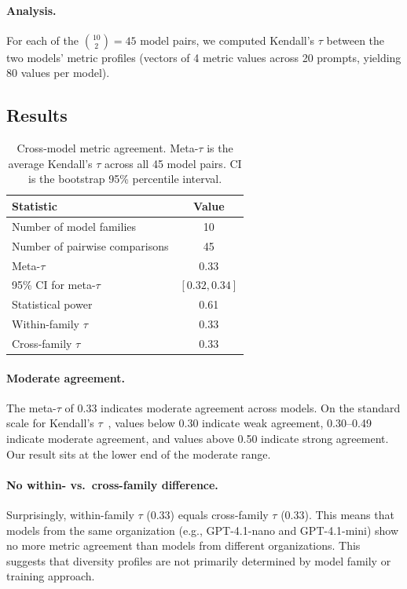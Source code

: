 \documentclass[11pt,a4paper]{article}
\begin{document}
\paragraph{Analysis.}
For each of the $\binom{10}{2} = 45$ model pairs, we
computed Kendall's $\tau$ between the two models'
metric profiles (vectors of 4 metric values across
20 prompts, yielding 80 values per model).

\subsection{Results}

\begin{table}[t]
\centering
\caption{Cross-model metric agreement.
Meta-$\tau$ is the average Kendall's $\tau$ across all
45 model pairs.  CI is the bootstrap 95\% percentile
interval.}
\label{tab:crossmodel}
\begin{tabular}{@{}lc@{}}
\toprule
Statistic & Value \\
\midrule
Number of model families & 10 \\
Number of pairwise comparisons & 45 \\
Meta-$\tau$ & 0.33 \\
95\% CI for meta-$\tau$ & $[0.32, 0.34]$ \\
Statistical power & 0.61 \\
Within-family $\tau$ & 0.33 \\
Cross-family $\tau$ & 0.33 \\
\bottomrule
\end{tabular}
\end{table}

\paragraph{Moderate agreement.}
The meta-$\tau$ of 0.33 indicates moderate agreement
across models.  On the standard scale for Kendall's
$\tau$~\citep{kendall1938new}, values below 0.30 indicate
weak agreement, 0.30--0.49 indicate moderate agreement,
and values above 0.50 indicate strong agreement.
Our result sits at the lower end of the moderate range.

\paragraph{No within- vs.\ cross-family difference.}
Surprisingly, within-family $\tau$ (0.33) equals
cross-family $\tau$ (0.33).  This means that models
from the same organization (e.g., GPT-4.1-nano and
GPT-4.1-mini) show no more metric agreement than models
from different organizations.  This suggests that
diversity profiles are not primarily determined by
model family or training approach.
\end{document}
